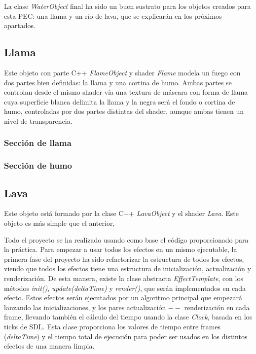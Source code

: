 \documentclass[12pt]{article}%
\begin{document}
	La clase \textit{WaterObject} final ha sido un buen sustrato para los objetos creados para esta PEC: una llama y un río de lava, que se explicarán en los próximos apartados.

\subsection{Llama}
	Este objeto con parte C++ \textit{FlameObject} y shader \textit{Flame} modela un fuego con dos partes bien definidas: la llama y una cortina de humo. Ambas partes se controlan desde el mismo shader vía una textura de máscara con forma de llama cuya superficie blanca delimita la llama y la negra será el fondo o cortina de humo, controladas por dos partes distintas del shader, aunque ambas tienen un nivel de transparencia.

\subsubsection{Sección de llama}

\subsubsection{Sección de humo}

\subsection{Lava}
	Este objeto está formado por la clase C++ \textit{LavaObject} y el shader \textit{Lava}. Este objeto es más simple que el anterior, 
	
	
	
	Todo el proyecto se ha realizado usando como base el código proporcionado para la práctica. Para empezar a usar todos los efectos en un mismo ejecutable, la primera fase del proyecto ha sido refactorizar la estructura de todos los efectos, viendo que todos los efectos tiene una estructura de inicialización, actualización y renderización. De esta manera, existe la clase abstracta \textit{EffectTemplate}, con los métodos \textit{init()}, \textit{update(deltaTime)} y \textit{render()}, que serán implementados en cada efecto. Estos efectos serán ejecutados por un algoritmo principal que empezará lanzando las inicializaciones, y los pares actualización $--$ renderización en cada frame, llevando también el cálculo del tiempo usando la clase \textit{Clock}, basada en los ticks de SDL. Esta clase proporciona los valores de tiempo entre frames (\textit{deltaTime}) y el tiempo total de ejecución para poder ser usados en los distintos efectos de una manera limpia.
	
\end{document}
